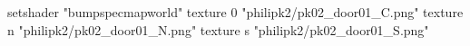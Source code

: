setshader "bumpspecmapworld"
    texture 0 "philipk2/pk02_door01_C.png"
    texture n "philipk2/pk02_door01_N.png"
    texture s "philipk2/pk02_door01_S.png"